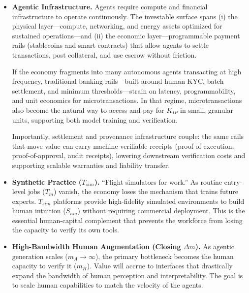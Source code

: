 \documentclass[12pt, letter]{article}
\begin{document}
\begin{itemize}
    \item \textbf{Agentic Infrastructure.} Agents require compute and financial infrastructure to operate continuously. The investable surface spans (i) the physical layer---compute, networking, and energy assets optimized for sustained operations---and (ii) the economic layer---programmable payment rails (stablecoins and smart contracts) that allow agents to settle transactions, post collateral, and use escrow without friction.

    If the economy fragments into many autonomous agents transacting at high frequency, traditional banking rails---built around human KYC, batch settlement, and minimum thresholds---strain on latency, programmability, and unit economics for microtransactions. In that regime, microtransactions also become the natural way to access and pay for $K_{IP}$ in small, granular units, supporting both model training and verification.
    
    Importantly, settlement and provenance infrastructure couple: the same rails that move value can carry machine-verifiable receipts (proof-of-execution, proof-of-approval, audit receipts), lowering downstream verification costs and supporting scalable warranties and liability transfer.
 
    \item \textbf{Synthetic Practice ($T_{sim}$).} ``Flight simulators for work.'' As routine entry-level jobs ($T_m$) vanish, the economy loses the mechanism that trains future experts. $T_{sim}$ platforms provide high-fidelity simulated environments to build human intuition ($S_{nm}$) without requiring commercial deployment. This is the essential human-capital complement that prevents the workforce from losing the capacity to verify its own tools.

    \item \textbf{High-Bandwidth Human Augmentation (Closing $\Delta m$).} As agentic generation scales ($m_A \to \infty$), the primary bottleneck becomes the human capacity to verify it ($m_H$). Value will accrue to interfaces that drastically expand the bandwidth of human perception and interpretability. The goal is to scale human capabilities to match the velocity of the agents.


\end{itemize}
\end{document}
